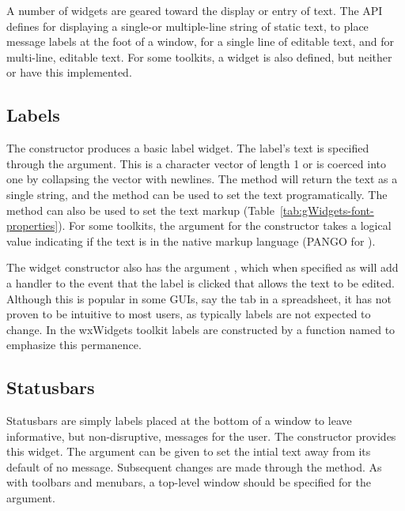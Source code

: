 A number of widgets are geared toward the display or entry of
text. The  API defines  for
displaying a single-or multiple-line string of static text,
 to place message labels at the foot of a
window,  for a single line of editable text, and
 for multi-line, editable text. For some toolkits,
a  widget is also defined, but neither 
or  have this implemented.

\subsection{Labels}
\label{sec:gWidgets-static-text}

The  constructor produces a basic label
widget. The label's text is specified through the
 argument. This is a character vector of length
1 or is coerced into one by collapsing the vector with newlines. The
 method will return the text as a single
string, and the  method can be used to
set the text programatically. The  method
can also be used to set the text markup
(Table~\ref{tab:gWidgets-font-properties}).  For some toolkits, the
argument  for the constructor takes a logical
value indicating if the text is in the native markup language (PANGO
for ).


The widget constructor also has the argument
, which when specified as  will
add a handler to the event that the label is clicked that allows the
text to be edited. 
Although this is popular in some GUIs, say the tab
in a spreadsheet, it has not proven to be intuitive to most users, as
typically labels are not expected to change. In the wxWidgets toolkit labels are
constructed by a function named  to emphasize this
permanence.


\subsection{Statusbars}
\label{sec:gWidgets-statusbars}

Statusbars are simply labels placed at the bottom of a window to leave
informative, but non-disruptive, messages for the user.  The
 constructor provides this widget.  The argument
 can be given to set the intial text away
from its default of no message. Subsequent changes are made through
the  method. As with toolbars and
menubars, a top-level window should be specified for the
 argument.



